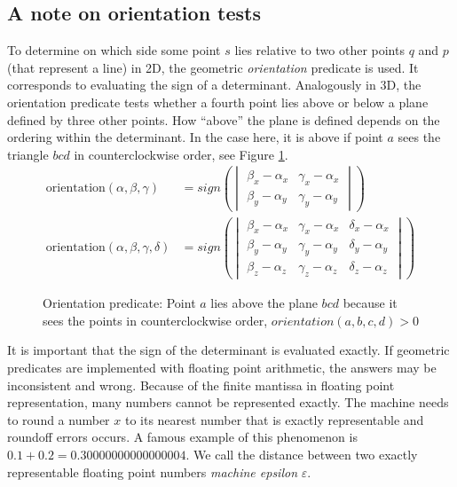 \documentclass[../thesis.tex]{subfiles}
\begin{document}
\subsection{A note on orientation tests}
To determine on which side some point $s$ lies relative to two other points $q$ and $p$ (that represent a line) in 2D, the geometric \emph{orientation} predicate is used.
It corresponds to evaluating the sign of a determinant. Analogously in 3D, the orientation predicate
tests whether a fourth point lies above or below a plane defined by three other points.
How ``above'' the plane is defined depends on the ordering within the determinant. In the case here,
it is above if point $a$ sees the triangle $bcd$ in counterclockwise order, see Figure \ref{fig:orient2d}.
\begin{align*}
  \mathrm{orientation}(\alpha, \beta, \gamma) &= 
  sign\left(
  \begin{vmatrix}
    \beta_x -\alpha_x & \gamma_x - \alpha_x \\
    \beta_y -\alpha_y & \gamma_y - \alpha_y 
  \end{vmatrix}\right)
  \\
  \mathrm{orientation}(\alpha, \beta, \gamma, \delta) &= 
  sign\left(
  \begin{vmatrix}
    \beta_x -\alpha_x & \gamma_x - \alpha_x & \delta_x - \alpha_x \\
    \beta_y -\alpha_y & \gamma_y - \alpha_y & \delta_y - \alpha_y \\
    \beta_z -\alpha_z & \gamma_z - \alpha_z & \delta_z - \alpha_z
  \end{vmatrix}\right)
\end{align*}
\begin{figure}[htb]
  \centering
  \def\svgwidth{20em}
  
  \caption{Orientation predicate: Point $a$ lies above the plane $bcd$ because it sees the points in counterclockwise order, $orientation(a,b,c,d)>0$}
  \label{fig:orient2d}
\end{figure}
It is important that the sign of the determinant is evaluated exactly.
If geometric predicates are implemented with floating point arithmetic,
the answers may be inconsistent and wrong.
Because of the finite mantissa in floating point representation, many numbers cannot be represented exactly.
The machine needs to round a number $x$ to its nearest number that is exactly representable
and roundoff errors occurs. A famous example of this phenomenon is ${0.1 + 0.2 = 0.30000000000000004}$.
We call the distance between two exactly representable floating point numbers \emph{machine epsilon} $\varepsilon$.
\end{document}
